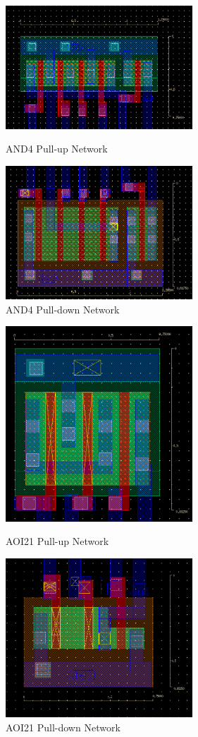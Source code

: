 \documentclass{article}
\begin{document}
\begin{figure}[ht]
\centering
\parbox{8cm}{
\includegraphics[width=7cm]{final_cells/AND4_PMOS}
  \caption{AND4 Pull-up Network}
\label{fig:AND4_pmos}}
\qquad
\begin{minipage}{7cm}
\includegraphics[width=7cm]{final_cells/AND4_NMOS}
  \caption{AND4 Pull-down Network}
\label{fig:AND4_nmos}
\end{minipage}
\end{figure}

\begin{figure}[ht]
\centering
\parbox{8cm}{
\includegraphics[width=7cm]{final_cells/AOI21_PMOS}
  \caption{AOI21 Pull-up Network}
\label{fig:AOI21_pmos}}
\qquad
\begin{minipage}{7cm}
\includegraphics[width=7cm]{final_cells/AOI21_NMOS}
  \caption{AOI21 Pull-down Network}
\label{fig:AOI21_nmos}
\end{minipage}
\end{figure}
\end{document}
